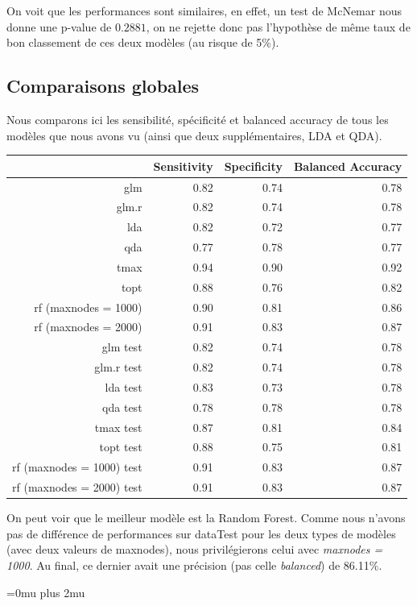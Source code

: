 \documentclass{article}
\begin{document}
On voit que les performances sont similaires, en effet, un test de McNemar nous donne une p-value de $0.2881$, on ne rejette donc pas l'hypothèse de même taux de bon classement de ces deux modèles (au risque de 5\%).

\subsection{Comparaisons globales}

Nous comparons ici les sensibilité, spécificité et balanced accuracy de tous les modèles que nous avons vu (ainsi que deux supplémentaires, LDA et QDA). 

\begin{table}[ht]
    \centering
    \begin{tabular}{|r|rrr|}
        \hline
        & Sensitivity & Specificity & Balanced Accuracy \\ 
        \hline
        glm & 0.82 & 0.74 & 0.78 \\ 
        glm.r & 0.82 & 0.74 & 0.78 \\ 
        lda & 0.82 & 0.72 & 0.77 \\ 
        qda & 0.77 & 0.78 & 0.77 \\ 
        tmax & 0.94 & 0.90 & 0.92 \\ 
        topt & 0.88 & 0.76 & 0.82 \\ 
        rf (maxnodes = 1000) & 0.90 & 0.81 & 0.86 \\ 
        rf (maxnodes = 2000) & 0.91 & 0.83 & 0.87 \\ 
        \hline
        \hline
        glm test & 0.82 & 0.74 & 0.78 \\ 
        glm.r test & 0.82 & 0.74 & 0.78 \\ 
        lda test & 0.83 & 0.73 & 0.78 \\ 
        qda test & 0.78 & 0.78 & 0.78 \\ 
        tmax test & 0.87 & 0.81 & 0.84 \\ 
        topt test & 0.88 & 0.75 & 0.81 \\ 
        rf (maxnodes = 1000) test & 0.91 & 0.83 & 0.87 \\ 
        rf (maxnodes = 2000) test & 0.91 & 0.83 & 0.87 \\ 
        \hline
    \end{tabular}
\end{table}

On peut voir que le meilleur modèle est la Random Forest. Comme nous n'avons pas de différence de performances sur dataTest pour les deux types de modèles (avec deux valeurs de maxnodes), nous privilégierons celui avec \emph{maxnodes = 1000}. Au final, ce dernier avait une précision (pas celle \emph{balanced}) de 86.11\%.

\newpage
\Urlmuskip=0mu plus 2mu
\printbibliography
\end{document}
